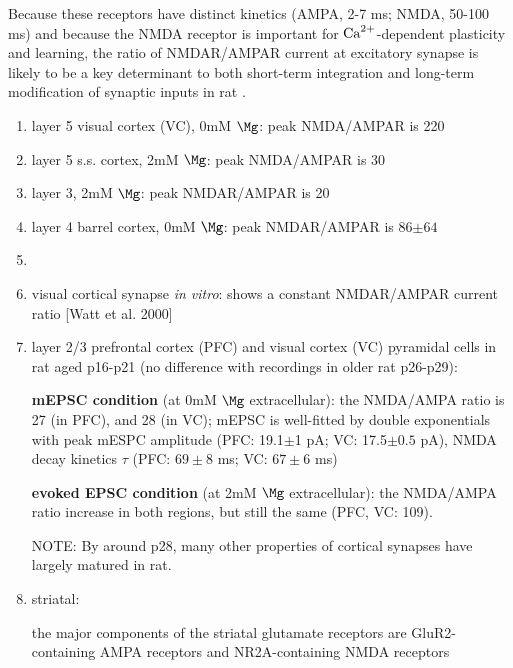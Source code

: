Because these receptors have distinct kinetics (AMPA, 2-7 ms; NMDA,   50-100 ms)
and because the NMDA receptor is important for ${\text{Ca}^{2+}}$-dependent plasticity
and learning, the ratio of NMDAR/AMPAR current at excitatory synapse is likely
to be a key determinant to both short-term integration and long-term
modification of synaptic inputs in rat \citep{myme2003}. 
\begin{enumerate}
  
  \item layer 5 visual cortex (VC), 0mM $\Mg$: peak NMDA/AMPAR is 220
  
  \item layer 5 s.s. cortex, 2mM $\Mg$: peak NMDA/AMPAR is 30
  
  \item  layer 3, 2mM $\Mg$: peak NMDAR/AMPAR is 20
  
  \item layer 4 barrel cortex,  0mM $\Mg$: peak NMDAR/AMPAR is 86$\pm 64$
  
  \item 
  
  \item visual cortical synapse {\it in vitro}: shows a constant NMDAR/AMPAR
  current ratio [Watt et al. 2000]
  
  
  
  \item layer 2/3 prefrontal cortex (PFC) and visual cortex (VC) 
  pyramidal cells in rat aged p16-p21 (no difference with recordings in older
  rat p26-p29):
  
  {\bf mEPSC condition} (at 0mM $\Mg$ extracellular): the NMDA/AMPA ratio is 27
  (in PFC), and 28 (in VC); mEPSC is well-fitted by double exponentials with
  peak mESPC amplitude (PFC:  19.1$\pm$1 pA; VC: 17.5$\pm 0.5$ pA), NMDA decay
  kinetics $\tau$ (PFC:  $69\pm 8$ ms; VC: $67\pm 6$ ms)
  
  {\bf evoked EPSC condition} (at 2mM $\Mg$ extracellular): the NMDA/AMPA ratio
  increase in both regions, but still the same (PFC, VC: 109).
  
NOTE: By around p28, many other properties of cortical synapses have largely
matured in rat.

  \item striatal: 
  
  
  the major components of the striatal glutamate receptors are GluR2-containing
  AMPA receptors and NR2A-containing NMDA receptors
  
  
\end{enumerate}

